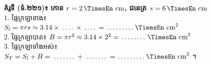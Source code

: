 \documentclass[a4paper,10pt]{article}
\newcommand{\en}[1]{{\TimesEn #1}}
\newcommand{\unit}[1]{\,\text{\en{#1}}}
\newcommand{\blank}[1]{\makebox[#1]{\dotfill}}
\begin{document}
\noindent
\begin{minipage}[t]{9.1cm}\vspace{0pt}
  \begin{tcolorbox}[
    enhanced, sharp corners, colback=white, colframe=black, equal height group=rowEx12,
    boxrule=0.8pt, boxsep=3pt, top=5.5pt, bottom=5.5pt, left=5pt, right=5pt
  ]\raggedright
    \textbf{គំរូទី \en{1} (ទំ.២២១)៖ កោន $r = 2\unit{cm}$, ជនេត្រ $s = 6\unit{cm}$}\\[5.5pt]
    $1.$ ផ្ទៃក្រឡាខាង៖\\
    \hspace*{0.2cm}$S_l = \pi r s \approx 3.14 \times \blank{0.7cm} \times \blank{0.7cm} = \blank{1.4cm}\unit{cm}^2$\\[5.5pt]
    $2.$ ផ្ទៃក្រឡាបាត៖ $B = \pi r^2 \approx 3.14 \times 2^2 = \blank{1.3cm}\unit{cm}^2$\\[5.5pt]
    $3.$ ផ្ទៃក្រឡាទាំងអស់៖\\
    \hspace*{0.2cm}$S_T = S_l + B = \blank{1.2cm} + \blank{1.2cm} = \blank{1.4cm}\unit{cm}^2$ ។
  \end{tcolorbox}
\end{minipage}%
\hfill
\end{document}
